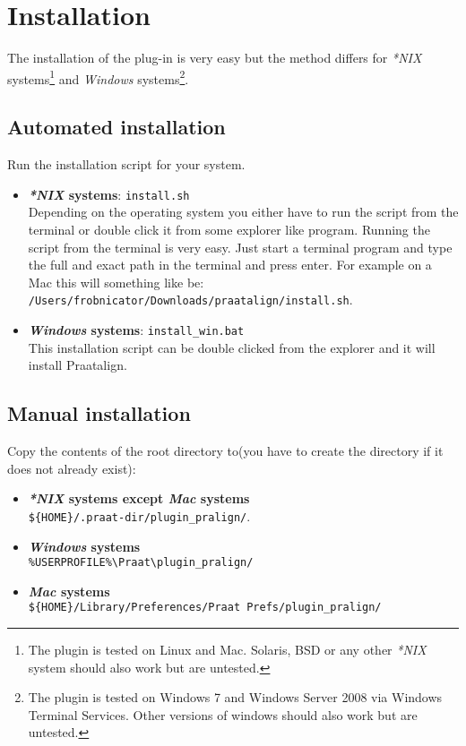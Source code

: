 \section{Installation}
\label{sec:installation}
The installation of the plug-in is very easy but the method differs for
\textit{*NIX} systems\footnote{The plugin is tested on Linux and Mac. Solaris,
BSD or any other \textit{*NIX} system should also work but are untested.}
and \textit{Windows} systems\footnote{The plugin is tested on Windows 7 and
Windows Server 2008 via Windows Terminal Services. Other versions of windows
should also work but are untested.}.
\subsection{Automated installation}
Run the installation script for your system.
\begin{itemize}
	\item \textbf{\textit{*NIX} systems}: \texttt{install.sh}\\
		Depending on the operating system you either have to run the script from
		the terminal or double click it from some explorer like program. Running
		the script from the terminal is very easy. Just start a terminal program
		and type the full and exact path in the terminal and press enter. For
		example on a Mac this will something like be: \texttt{%
		/Users/frobnicator/Downloads/praatalign/install.sh}.
	\item \textbf{\textit{Windows} systems}: \texttt{install\_win.bat}\\
		This installation script can be double clicked from the explorer and it
		will install Praatalign.
\end{itemize}

\subsection{Manual installation}
Copy the contents of the root directory to(you have to create the directory if
it does not already exist):
\begin{itemize}
	\item \textbf{\textit{*NIX} systems except \textit{Mac} systems}\\
		\texttt{\$\{HOME\}/.praat-dir/plugin\_pralign/}.
	\item \textbf{\textit{Windows} systems}\\
		\texttt{\%USERPROFILE\%\textbackslash Praat\textbackslash plugin\_pralign/}
	\item \textbf{\textit{Mac} systems}\\
		\texttt{\$\{HOME\}/Library/Preferences/Praat Prefs/plugin\_pralign/}
\end{itemize}

